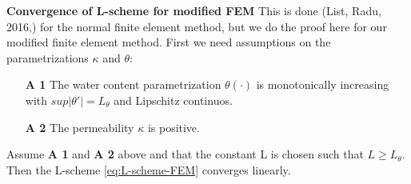 \documentclass[../Main/main.tex]{subfiles}
\begin{document}
	
	\vspace{100pt}
	\textbf{Convergence of L-scheme for modified FEM}
	This is done (List, Radu, 2016,\cite{list2016study}) for the normal finite element method, but we do the proof here for our modified finite element method. 
	First we need assumptions on the parametrizations $\kappa $ and $\theta$:
	\begin{itemize}
		\item[\textbf{A 1}] The water content parametrization $\theta(\cdot)$ is monotonically increasing with $sup|\theta'| = L_{\theta}$ and Lipschitz continuos.
		\item[\textbf{A 2}] The permeability $\kappa$ is positive. 
	\end{itemize}
	\begin{theorem}
		Assume \textbf{A 1} and \textbf{A 2} above and that the constant L is chosen such that $L \geq L_{\theta}$. Then the L-scheme \eqref{eq:L-scheme-FEM} converges linearly. 
	\end{theorem}
\end{document}

